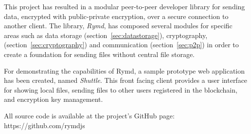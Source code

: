 This project has resulted in a modular peer-to-peer developer library for sending data, encrypted with public-private encryption, over a secure connection to another client. The library, \emph{Rymd}, has composed several modules for specific areas such as data storage (section~\ref{sec:datastorage}), cryptography, (section~\ref{sec:cryptography}) and communication (section~\ref{sec:p2p}) in order to create a foundation for sending files without central file storage.

For demonstrating the capabilities of Rymd, a sample prototype web application has been created, named \emph{Shuttle}. This front facing client provides a user interface for showing local files, sending files to other users registered in the blockchain, and encryption key management.

All source code is available at the project's GitHub page: https://github.com/rymdjs
